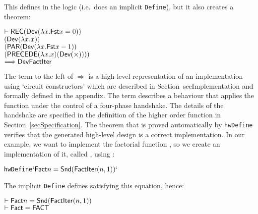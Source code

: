 \vspace*{-2mm}

\noindent This defines  in the logic (i.e.~does an
implicit \texttt{Define}), but it also creates a theorem:

\vspace*{-2mm}

{\baselineskip10pt\begin{alltt}
\( \vdash \DEF{REC} (\DEF{Dev} ({\lambda}x. \DEF{Fst} x = 0))         \) 
\(        (\DEF{Dev} ({\lambda}x. x))                                 \)
\(        (\DEF{PAR} (\DEF{Dev} ({\lambda}x. \DEF{Fst} x - 1))        \)
\(             (\DEF{PRECEDE} ({\lambda}x. x) (\DEF{Dev}({\times})))) \)
\(    \Longrightarrow \DEF{Dev} \DEF{FactIter}                        \)
\end{alltt}}

\vspace*{-2mm}

\noindent The term to the left of $\Longrightarrow$ is a high-level
representation of an implementation using `circuit constructors' which
are described in Section~{secImplementation} and formally defined in the
appendix.  The term  describes a behaviour that
applies the function  under the control of a four-phase
handshake. The details of the handshake are specified in the
definition of the higher order function  in
Section~\ref{secSpecification}. The theorem that is proved
automatically by
\texttt{hwDefine} verifies that the generated high-level design is a correct
implementation. In our example, we want to implement the factorial
function , so we create an implementation of it, called
, using :

\vspace*{-2mm}

{\baselineskip10pt\begin{alltt}
 hwDefine\( `\DEF{Fact} n = \DEF{Snd}(\DEF{FactIter} (n,1))`  \)
\end{alltt}}

\vspace*{-2mm}

\noindent The implicit \texttt{Define} defines  satisfying this equation, hence:

\vspace*{-2mm}

{\baselineskip14pt\begin{alltt}
\( \vdash \DEF{Fact} n = \DEF{Snd}(\DEF{FactIter}(n,1)) \)
\( \vdash \DEF{Fact} = \DEF{FACT}                       \)
\end{alltt}}


